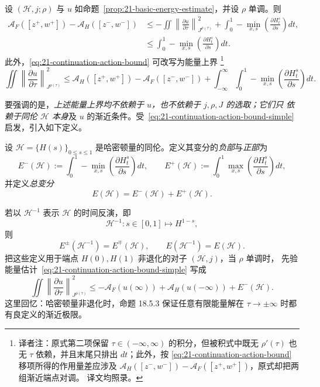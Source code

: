 \begin{corollary}
\label{cor:21-continuation-energy}
设 $(\mathcal H,j;\rho)$ 与 $u$ 如命题~\ref{prop:21-basic-energy-estimate}，并设 $\rho$
单调。则
\begin{align}
 \mathcal A_F([z^+,w^+])-\mathcal A_H([z^-,w^-])
 &\leq-\iint\left\lVert\frac{\partial u}{\partial\tau}\right\rVert_{J^{\rho(\tau)}}^2
 +\int_0^1-\min_{x,s}\left(\frac{\partial H_t^s}{\partial s}\right)dt,
 \label{eq:21-continuation-action-bound}\\
 &\leq\int_0^1-\min_{x,s}\left(\frac{\partial H_t^s}{\partial s}\right)dt.
 \label{eq:21-continuation-action-bound-simple}
\end{align}
此外，\eqref{eq:21-continuation-action-bound} 可改写为能量上界
\footnote{译者注：原式第二项保留 $\tau\in(-\infty,\infty)$ 的积分，但被积式中既无
$\rho'(\tau)$ 也无 $\tau$ 依赖，并且末尾只排出 $dt$；此外，按
\eqref{eq:21-continuation-action-bound} 移项所得的作用量差应涉及
$\mathcal A_H([z^-,w^-])-\mathcal A_F([z^+,w^+])$，原式却把两组渐近端点对调。
译文均照录。}
\begin{equation}
 \iint\left\lVert\frac{\partial u}{\partial\tau}\right\rVert_{J^{\rho(\tau)}}^2
 \leq\mathcal A_H([z^+,w^+])-\mathcal A_F([z^-,w^-])
 +\int_{-\infty}^{\infty}\!\int_0^1
 -\min_{x,s}\left(\frac{\partial H_t^s}{\partial s}\right)dt.
 \label{eq:21-continuation-energy-bound}
\end{equation}
\end{corollary}

要强调的是，\emph{上述能量上界均不依赖于 $u$，也不依赖于 $j,\rho,J$ 的选取；它们只
依赖于同伦 $\mathcal H$ 本身}及 $u$ 的渐近条件。受~\eqref{eq:21-continuation-action-bound-simple}
启发，引入如下定义。

\begin{definition}
\label{def:21-homotopy-variation}
设 $\mathcal H=\{H(s)\}_{0\leq s\leq1}$ 是哈密顿量的同伦。定义其变分的\emph{负部}与\emph{正部}为
\[
 E^-(\mathcal H):=\int_0^1-\min_{x,s}\left(\frac{\partial H_t^s}{\partial s}\right)dt,
 \qquad
 E^+(\mathcal H):=\int_0^1\max_{x,s}\left(\frac{\partial H_t^s}{\partial s}\right)dt,
\]
并定义\emph{总变分}
\[
 E(\mathcal H)=E^-(\mathcal H)+E^+(\mathcal H).
\]
\end{definition}

若以 $\mathcal H^{-1}$ 表示 $\mathcal H$ 的时间反演，即
\[
 \mathcal H^{-1}:s\in[0,1]\longmapsto H^{1-s},
\]
则
\[
 E^\pm(\mathcal H^{-1})=E^\mp(\mathcal H),\qquad
 E(\mathcal H^{-1})=E(\mathcal H).
\]
把这些定义用于端点 $H(0),H(1)$ 非退化的对子 $(\mathcal H,j)$，当 $\rho$ 单调时，
先验能量估计~\eqref{eq:21-continuation-action-bound-simple} 写成
\[
 \iint\left\lVert\frac{\partial u}{\partial\tau}\right\rVert_{J^{\rho(\tau)}}^2
 \leq-\mathcal A_F(u(\infty))+\mathcal A_H(u(-\infty))+E^-(\mathcal H).
\]
这里回忆：哈密顿量非退化时，命题 18.5.3 保证任意有限能量解在
$\tau\to\pm\infty$ 时都有良定义的渐近极限。

